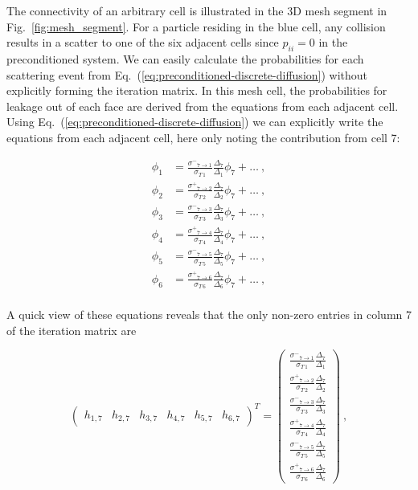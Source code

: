\documentclass[preprint,12pt]{elsarticle}
\newcommand{\sigm}{\ensuremath{\sigma^{-}}}
\newcommand{\sigp}{\ensuremath{\sigma^{+}}}
\begin{document}
The connectivity of an arbitrary cell is illustrated in the 3D mesh
segment in Fig.~\ref{fig:mesh_segment}.  For a particle residing in
the blue cell, any collision results in a scatter to one of the six
adjacent cells since $p_{ii}=0$ in the preconditioned system.  We can
easily calculate the probabilities for each scattering event from
Eq.~(\ref{eq:preconditioned-discrete-diffusion}) without explicitly
forming the iteration matrix.  In this mesh cell, the probabilities
for leakage out of each face are derived from the equations from each
adjacent cell.  Using Eq.~(\ref{eq:preconditioned-discrete-diffusion})
we can explicitly write the equations from each adjacent cell, here
only noting the contribution from cell 7:

\begin{align*}
  \phi_1 &= \frac{\sigm_{7\rightarrow
      1}}{\sigma_{T\,1}}\frac{\Delta_7}{\Delta_1}\phi_7 +
  \ldots\:,\\ \phi_2 &= \frac{\sigp_{7\rightarrow 2}}
          {\sigma_{T\,2}}\frac{\Delta_7}{\Delta_2}\phi_7 + \ldots\:,\\ 
      \phi_3 &= \frac{\sigm_{7\rightarrow
          3}}{\sigma_{T\,3}}\frac{\Delta_7}{\Delta_3}\phi_7 +
      \ldots\:,\\  \phi_4 &= \frac{\sigp_{7\rightarrow
      4}}{\sigma_{T\,4}}\frac{\Delta_7}{\Delta_4}\phi_7 +
          \ldots\:,\\  \phi_5 &= \frac{\sigm_{7\rightarrow
          5}}{\sigma_{T\,5}}\frac{\Delta_7}{\Delta_5}\phi_7 +
              \ldots\:,\\  \phi_6 &= \frac{\sigp_{7\rightarrow
              6}}{\sigma_{T\,6}}\frac{\Delta_7}{\Delta_6}\phi_7 +
                  \ldots\:,\\ 
\end{align*} 

A quick view of these equations reveals that the only non-zero entries
in column 7 of the iteration matrix are

\begin{equation*}
  \begin{pmatrix}
    h_{1,7} & h_{2,7} & h_{3,7} & h_{4,7} & h_{5,7} & h_{6,7}
  \end{pmatrix}^{T}
  =
  \begin{pmatrix}
    \frac{\sigm_{7\rightarrow
        1}}{\sigma_{T\,1}}\frac{\Delta_7}{\Delta_1}
    \\ \frac{\sigp_{7\rightarrow
        2}}{\sigma_{T\,2}}\frac{\Delta_7}{\Delta_2}
    \\ \frac{\sigm_{7\rightarrow
        3}}{\sigma_{T\,3}}\frac{\Delta_7}{\Delta_3}
    \\ \frac{\sigp_{7\rightarrow
        4}}{\sigma_{T\,4}}\frac{\Delta_7}{\Delta_4}
    \\ \frac{\sigm_{7\rightarrow
        5}}{\sigma_{T\,5}}\frac{\Delta_7}{\Delta_5}
    \\ \frac{\sigp_{7\rightarrow
        6}}{\sigma_{T\,6}}\frac{\Delta_7}{\Delta_6}
  \end{pmatrix}\:,
\end{equation*}
\end{document}
